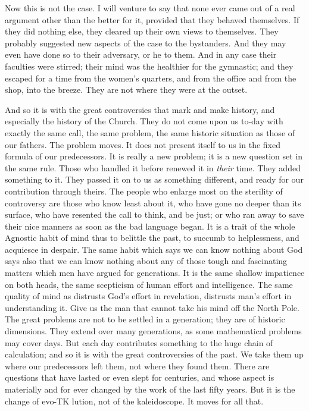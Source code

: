 \documentclass[12pt,a5paper,twoside]{book}
\begin{document}
Now this is not the case. I will venture to say 
that none ever came out of a real argument other 
than the better for it, provided that they behaved 
themselves. If they did nothing else, they cleared up 
their own views to themselves. They probably suggested 
new aspects of the case to the bystanders. And 
they may even have done so to their adversary, or he 
to them. And in any case their faculties were 
stirred; their mind was the healthier for the gymnastic; 
and they escaped for a time from the women's 
quarters, and from the office and from the shop, into 
the breeze. They are not where they were at the 
outset. 

And so it is with the great controversies that mark 
and make history, and especially the history of the 
Church. They do not come upon us to-day with 
exactly the same call, the same problem, the same 
historic situation as those of our fathers. The problem 
moves. It does not present itself to us in the 
fixed formula of our predecessors. It is really a new 
problem; it is a new question set in the same rule. 
Those who handled it before renewed it in \textit{their} time. 
They added something to it. They passed it on to 
us as something different, and ready for our contribution
through theirs. The people who enlarge most 
on the sterility of controversy are those who know 
least about it, who have gone no deeper than its 
surface, who have resented the call to think, and be 
just; or who ran away to save their nice manners 
as soon as the bad language began. It is a trait 
of the whole Agnostic habit of mind thus to belittle 
the past, to succumb to helplessness, and acquiesce 
in despair. The same habit which says we can know 
nothing about God says also that we can know nothing 
about any of those tough and fascinating matters 
which men have argued for generations. It is the 
same shallow impatience on both heads, the same 
scepticism of human effort and intelligence. The 
same quality of mind as distrusts God's effort in 
revelation, distrusts man's effort in understanding it. 
Give us the man that cannot take his mind off the 
North Pole. The great problems are not to be settled 
in a generation; they are of historic dimensions. 
They extend over many generations, as some mathematical 
problems may cover days. But each day contributes 
something to the huge chain of calculation; 
and so it is with the great controversies of the past. 
We take them up where our predecessors left them, 
not where they found them. There are questions 
that have lasted or even slept for centuries, and whose 
aspect is materially and for ever changed by the work 
of the last fifty years. But it is the change of evo-TK
lution, not of the kaleidoscope. It moves for all that. 
\end{document}

